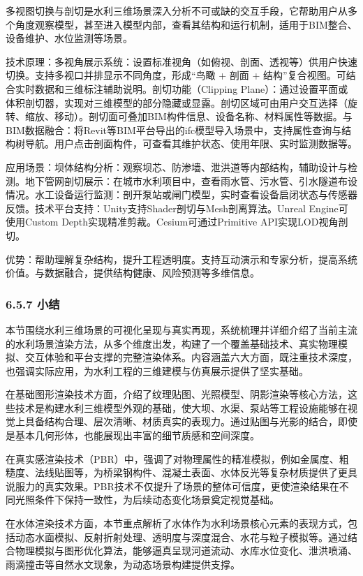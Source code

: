 多视图切换与剖切是水利三维场景深入分析不可或缺的交互手段，它帮助用户从多个角度观察模型，甚至进入模型内部，查看其结构和运行机制，适用于BIM整合、设备维护、水位监测等场景。

技术原理：多视角展示系统：设置标准视角（如俯视、剖面、透视等）供用户快速切换。支持多视口并排显示不同角度，形成``鸟瞰 + 剖面 + 结构''复合视图。可结合实时数据和三维标注辅助说明。剖切功能（Clipping Plane）：通过设置平面或体积剖切器，实现对三维模型的部分隐藏或显露。剖切区域可由用户交互选择（旋转、缩放、移动）。剖切面可叠加BIM构件信息、设备名称、材料属性等数据。与BIM数据融合：将Revit等BIM平台导出的ifc模型导入场景中，支持属性查询与结构树导航。用户点击剖面构件，可查看其维护状态、使用年限、实时监测数据等。

应用场景：坝体结构分析：观察坝芯、防渗墙、泄洪道等内部结构，辅助设计与检测。地下管网剖切展示：在城市水利项目中，查看雨水管、污水管、引水隧道布设情况。水工设备运行监测：剖开泵站或闸门模型，实时查看设备启闭状态与传感器反馈。技术平台支持：Unity支持Shader剖切与Mesh剖离算法。Unreal Engine可使用Custom Depth实现精准剪裁。Cesium可通过Primitive API实现LOD视角剖切。

优势：帮助理解复杂结构，提升工程透明度。支持互动演示和专家分析，提高系统价值。与数据融合，提供结构健康、风险预测等多维信息。

\hypertarget{ux5c0fux7ed3-4}{%
\subsubsection{6.5.7 小结}\label{ux5c0fux7ed3-4}}

本节围绕水利三维场景的可视化呈现与真实再现，系统梳理并详细介绍了当前主流的水利场景渲染方法，从多个维度出发，构建了一个覆盖基础技术、真实物理模拟、交互体验和平台支撑的完整渲染体系。内容涵盖六大方面，既注重技术深度，也强调实际应用，为水利工程的三维建模与仿真展示提供了坚实基础。

在基础图形渲染技术方面，介绍了纹理贴图、光照模型、阴影渲染等核心方法，这些技术是构建水利三维模型外观的基础，使大坝、水渠、泵站等工程设施能够在视觉上具备结构合理、层次清晰、材质真实的表现力。通过贴图与光影的结合，即使是基本几何形体，也能展现出丰富的细节质感和空间深度。

在真实感渲染技术（PBR）中，强调了对物理属性的精准模拟，例如金属度、粗糙度、法线贴图等，为桥梁钢构件、混凝土表面、水体反光等复杂材质提供了更具说服力的真实效果。PBR技术不仅提升了场景的整体可信度，更使渲染结果在不同光照条件下保持一致性，为后续动态变化场景奠定视觉基础。

在水体渲染技术方面，本节重点解析了水体作为水利场景核心元素的表现方式，包括动态水面模拟、反射折射处理、透明度与深度混合、水花与粒子模拟等。通过结合物理模拟与图形优化算法，能够逼真呈现河道流动、水库水位变化、泄洪喷涌、雨滴撞击等自然水文现象，为动态场景构建提供支撑。

